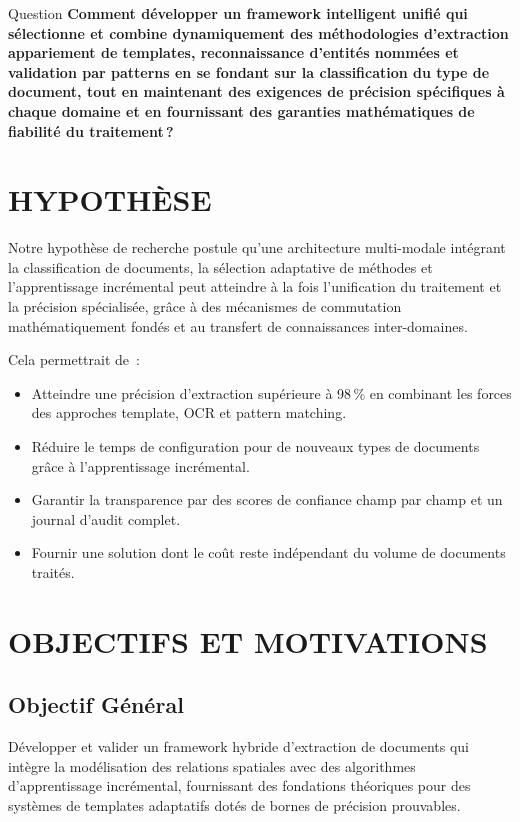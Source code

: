 \begin{bidentidad}{Question}
    \centering 
    \textbf{Comment développer un framework intelligent unifié qui sélectionne et combine dynamiquement des méthodologies d'extraction appariement de templates, reconnaissance d'entités nommées et validation par patterns en se fondant sur la classification du type de document, tout en maintenant des exigences de précision spécifiques à chaque domaine et en fournissant des garanties mathématiques de fiabilité du traitement\,?}
\end{bidentidad}

\section*{\color{darkgray}HYPOTHÈSE}
Notre hypothèse de recherche postule qu'une architecture multi-modale intégrant la classification de documents, la sélection adaptative de méthodes et l'apprentissage incrémental peut atteindre à la fois l'unification du traitement et la précision spécialisée, grâce à des mécanismes de commutation mathématiquement fondés et au transfert de connaissances inter-domaines.

Cela permettrait de~:
\begin{itemize}[label=, font=\large \color{darkgray}]
\item Atteindre une précision d'extraction supérieure à 98\,\% en combinant les forces des approches template, OCR et pattern matching.
\item Réduire le temps de configuration pour de nouveaux types de documents grâce à l'apprentissage incrémental.
\item Garantir la transparence par des scores de confiance champ par champ et un journal d'audit complet.
\item Fournir une solution dont le coût reste indépendant du volume de documents traités.
\end{itemize}

\section*{\color{darkgray}OBJECTIFS ET MOTIVATIONS}

\subsection*{Objectif Général}
Développer et valider un framework hybride d'extraction de documents qui intègre la modélisation des relations spatiales avec des algorithmes d'apprentissage incrémental, fournissant des fondations théoriques pour des systèmes de templates adaptatifs dotés de bornes de précision prouvables.


